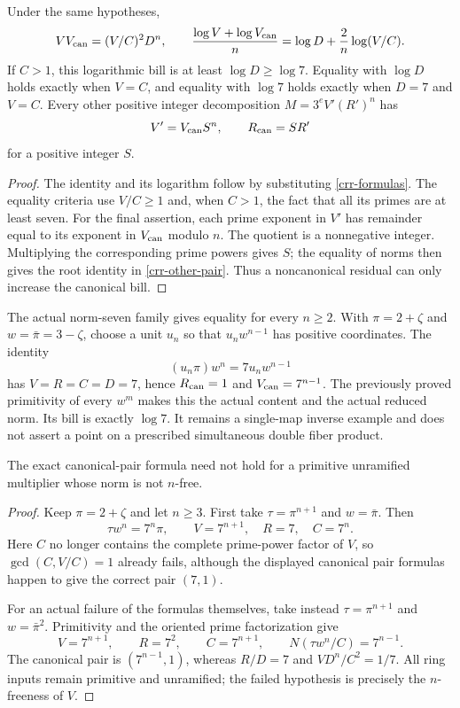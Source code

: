 \begin{corollary}\label{crr-bill}
Under the same hypotheses,
\begin{equation}\label{crr-exact-bill}
 VV_{\rm can}=(V/C)^2D^n,
 \qquad
 \frac{\log V+\log V_{\rm can}}n
   =\log D+\frac2n\log(V/C).
\end{equation}
If $C>1$, this logarithmic bill is at least $\log D\ge\log7$.
Equality with $\log D$ holds exactly when $V=C$, and equality with
$\log7$ holds exactly when $D=7$ and $V=C$.
Every other positive integer decomposition
$M=3^eV'(R')^n$ has
\begin{equation}\label{crr-other-pair}
 V'=V_{\rm can}S^n,\qquad R_{\rm can}=SR'
\end{equation}
for a positive integer $S$.
\end{corollary}
\begin{proof}
The identity and its logarithm follow by substituting
\eqref{crr-formulas}. The equality criteria use $V/C\ge1$ and,
when $C>1$, the fact that all its primes are at least seven.
For the final assertion, each prime exponent in $V'$ has remainder
equal to its exponent in $V_{\rm can}$ modulo $n$. The quotient
is a nonnegative integer. Multiplying the corresponding prime powers
gives $S$;
the equality of norms then gives the root identity in
\eqref{crr-other-pair}. Thus a noncanonical residual can only
increase the canonical bill.
\end{proof}

The actual norm-seven family gives equality for every $n\ge2$.
With $\pi=2+\zeta$ and $w=\bar\pi=3-\zeta$, choose a unit $u_n$
so that $u_nw^{n-1}$ has positive coordinates. The identity
\[
 (u_n\pi)w^n=7u_nw^{n-1}
\]
has $V=R=C=D=7$, hence
$R_{\rm can}=1$ and $V_{\rm can}=7^{n-1}$.
The previously proved primitivity of every $w^m$ makes this the actual
content and the actual reduced norm. Its bill is exactly $\log7$.
It remains a single-map inverse example and does not assert a point
on a prescribed simultaneous double fiber product.

\begin{proposition}
\label{crr-boundary}
The exact canonical-pair formula need not hold for a primitive
unramified multiplier whose norm is not $n$-free.
\end{proposition}
\begin{proof}
Keep $\pi=2+\zeta$ and let $n\ge3$. First take
$\tau=\pi^{n+1}$ and $w=\bar\pi$. Then
\[
 \tau w^n=7^n\pi,\qquad
 V=7^{n+1},\quad R=7,\quad C=7^n.
\]
Here $C$ no longer contains the complete prime-power factor of $V$,
so $\gcd(C,V/C)=1$ already fails, although the displayed canonical
pair formulas happen to give the correct pair $(7,1)$.

For an actual failure of the formulas themselves, take instead
$\tau=\pi^{n+1}$ and $w=\bar\pi^2$. Primitivity and the oriented
prime factorization give
\[
 V=7^{n+1},\qquad R=7^2,\qquad C=7^{n+1},\qquad
 N(\tau w^n/C)=7^{n-1}.
\]
The canonical pair is $(7^{n-1},1)$, whereas $R/D=7$ and
$VD^n/C^2=1/7$. All ring inputs remain primitive and unramified;
the failed hypothesis is precisely the $n$-freeness of $V$.
\end{proof}

